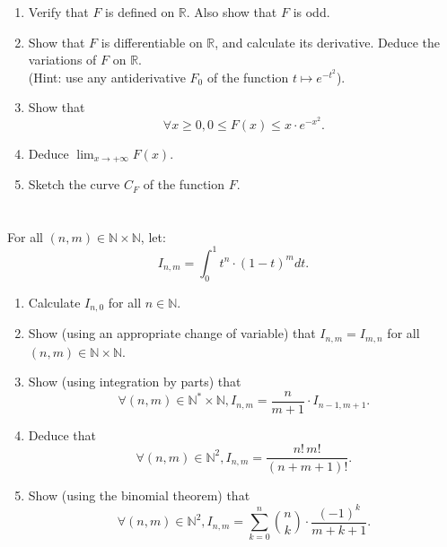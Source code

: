 \documentclass[12pt]{article}
\begin{document}
\begin{enumerate}
\item Verify that $F$ is defined on $\mathbb{R}$. Also show that $F$ is odd.
\item Show that $F$ is differentiable on $\mathbb{R}$, and calculate its derivative. Deduce the variations of $F$ on $\mathbb{R}$.\\
(Hint: use any antiderivative $F_0$ of the function $t \mapsto e^{-t^2}$).
\item Show that
$$\forall x \geq 0, 0 \leq F(x) \leq x \cdot e^{-x^2}.$$
\item Deduce $\lim_{x \to +\infty} F(x)$.
\item Sketch the curve $C_F$ of the function $F$.
\end{enumerate}

\newpage

\begin{answerbox}


\end{answerbox}

\newpage

\section{}
For all $(n, m) \in \mathbb{N} \times \mathbb{N}$, let:
$$I_{n,m} = \int_{0}^{1} t^n \cdot (1-t)^m dt.$$

\begin{enumerate}
\item Calculate $I_{n,0}$ for all $n \in \mathbb{N}$.
\item Show (using an appropriate change of variable) that $I_{n,m} = I_{m,n}$ for all $(n, m) \in \mathbb{N} \times \mathbb{N}$.
\item Show (using integration by parts) that
$$\forall (n, m) \in \mathbb{N}^* \times \mathbb{N}, I_{n,m} = \frac{n}{m+1} \cdot I_{n-1,m+1}.$$
\item Deduce that
$$\forall (n, m) \in \mathbb{N}^2, I_{n,m} = \frac{n! \, m!}{(n+m+1)!}.$$
\item Show (using the binomial theorem) that
$$\forall (n, m) \in \mathbb{N}^2, I_{n,m} = \sum_{k=0}^{n} \binom{n}{k} \cdot \frac{(-1)^k}{m+k+1}.$$
\end{enumerate}

\newpage

\begin{answerbox}


\end{answerbox}

\end{document}
